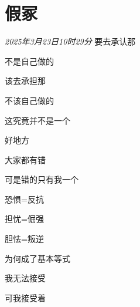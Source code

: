 \section*{假冢}
\begin{center}
\textit{2025年3月23日10时29分}\hh 
要去承认那

不是自己做的

该去承担那

不该自己做的

这究竟并不是一个

好地方

大家都有错

可是错的只有我一个

恐惧=反抗

担忧=倔强

胆怯=叛逆

为何成了基本等式

我无法接受

可我接受着
\end{center}